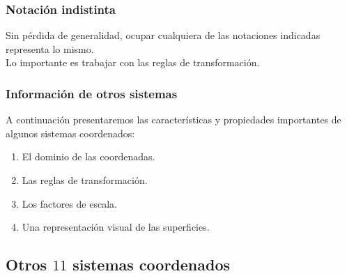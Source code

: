 \documentclass[12pt]{beamer}
\begin{document}
\begin{frame}
\frametitle{Notación indistinta}
Sin pérdida de generalidad, ocupar cualquiera de las notaciones indicadas representa lo mismo.
\\
\bigskip
\pause
Lo importante es trabajar con las reglas de transformación.
\end{frame}
\begin{frame}
\frametitle{Información de otros sistemas}
A continuación presentaremos las características y propiedades importantes de algunos sistemas coordenados:
\pause
{}
\begin{enumerate}[<+->]
\item El dominio de las coordenadas.
\item Las reglas de transformación. 
\item Los factores de escala.
\item Una representación visual de las superficies.
\end{enumerate}
\end{frame}

\subsection{Otros \texorpdfstring{$11$}{11} sistemas coordenados}

\end{document}

